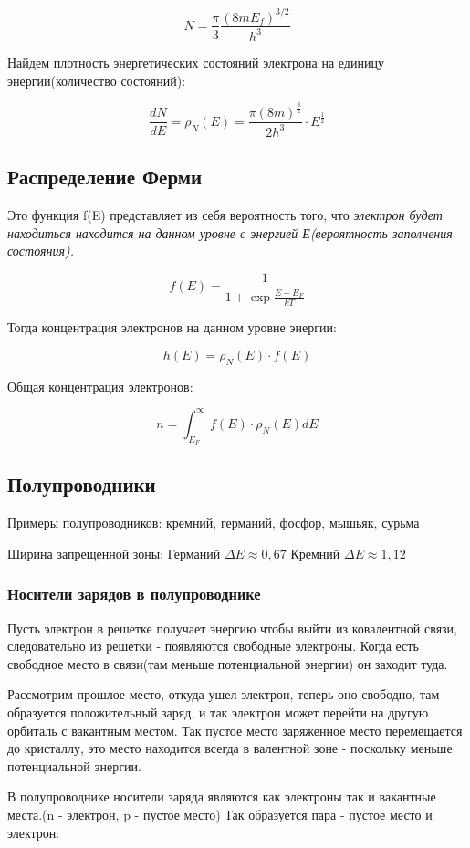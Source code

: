 \documentclass[../main.tex]{subfiles}
\begin{document}
\[N = \frac{\pi}{3} \frac{(8mE_f)^{3/2}}{h^3}\]

Найдем плотность энергетических состояний электрона на единицу энергии(количество состояний): 

\[\frac{dN}{dE} = \rho_N(E) = \frac{\pi (8m)^{\frac{3}{2}}}{2 h^3} \cdot E^{\frac{1}{2}}\]

\subsection{Распределение Ферми}

Это функция f(E) представляет из себя вероятность того, что \textit{электрон будет находиться находится на данном уровне с энергией Е(вероятность заполнения состояния).}

\[f(E) = \frac{1}{1 + \exp{\frac{E-E_F}{kT}}}\]

Тогда концентрация электронов на данном уровне энергии:

\[h(E) = \rho_N(E) \cdot f(E)\]

Общая концентрация электронов:

\[n = \int_{E_F}^{\infty} f(E) \cdot \rho_N(E) dE\]

\subsection{Полупроводники}

Примеры полупроводников: кремний, германий, фосфор, мышьяк, сурьма

Ширина запрещенной зоны: Германий $\Delta E \approx 0,67$ Кремний $\Delta E \approx 1,12$

\subsubsection{Носители зарядов в полупроводнике}

Пусть электрон в решетке получает энергию чтобы выйти из ковалентной связи, следовательно из решетки - появляются свободные электроны.
Когда есть свободное место в связи(там меньше потенциальной энергии) он заходит туда.

Рассмотрим прошлое место, откуда ушел электрон, теперь оно свободно, там образуется положительный заряд, и так электрон может перейти на другую орбиталь с вакантным местом.
Так пустое место заряженное место перемещается до кристаллу, это место находится всегда в валентной зоне - поскольку меньше потенциальной энергии.

В полупроводнике носители заряда являются как электроны так и вакантные места.(n - электрон, p - пустое место)
Так образуется пара - пустое место и электрон. 
\end{document}
